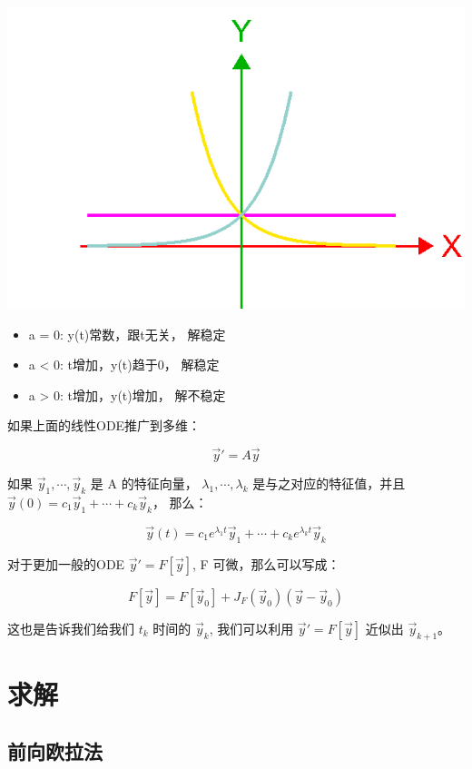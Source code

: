 \documentclass[
]{book}
\providecommand{\tightlist}{%
  \setlength{\itemsep}{0pt}\setlength{\parskip}{0pt}}
\begin{document}
\includegraphics{images/ode_solution.png}

\begin{itemize}
\tightlist
\item
  a = 0: y(t)常数，跟t无关， 解稳定
\item
  a \textless{} 0: t增加，y(t)趋于0， 解稳定
\item
  a \textgreater{} 0: t增加，y(t)增加， 解不稳定
\end{itemize}

如果上面的线性ODE推广到多维：

\[
\vec{y}' = A \vec{y}
\]

如果 \(\vec{y}_1, \cdots, \vec{y}_k\) 是 A 的特征向量， \(\lambda_1, \cdots, \lambda_k\) 是与之对应的特征值，并且 \(\vec{y}(0) = c_1\vec{y}_1 + \cdots + c_k\vec{y}_k\)， 那么：

\[
\vec{y}(t) = c_1 e^{\lambda_1 t}\vec{y}_1 + \cdots + c_k e^{\lambda_k t}\vec{y}_k
\]

对于更加一般的ODE \(\vec{y}' = F[\vec{y}]\), F 可微，那么可以写成：

\[
F[\vec{y}] = F[\vec{y}_0] + J_F(\vec{y}_0)(\vec{y} - \vec{y}_0)
\]

这也是告诉我们给我们 \(t_k\) 时间的 \(\vec{y}_k\), 我们可以利用 \(\vec{y}' = F[\vec{y}]\) 近似出 \(\vec{y}_{k+1}\)。

\hypertarget{ux6c42ux89e3}{%
\section{求解}\label{ux6c42ux89e3}}

\hypertarget{ux524dux5411ux6b27ux62c9ux6cd5}{%
\subsection{前向欧拉法}\label{ux524dux5411ux6b27ux62c9ux6cd5}}
\end{document}
